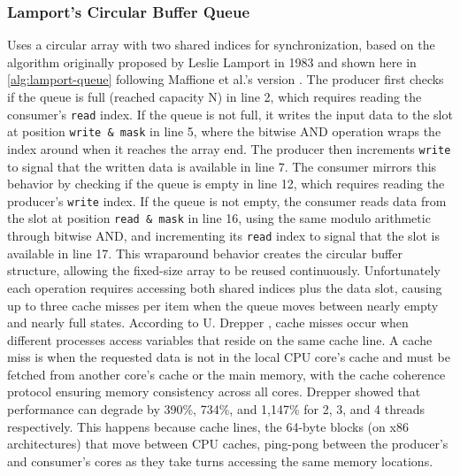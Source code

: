 \subsubsection{Lamport's Circular Buffer Queue}\label{subsubsec:lamport-circular-buffer-queue}
Uses a circular array with two shared indices for synchronization, based on the algorithm originally proposed by Leslie Lamport in 1983 \cite{Lamport1983SPSCCircularBuffer} and shown here in \cref{alg:lamport-queue} following Maffione et al.'s version \cite{MaffioneCacheAware}. The producer first checks if the queue is full (reached capacity N) in line 2, which requires reading the consumer's \texttt{read} index. If the queue is not full, it writes the input data to the slot at position \texttt{write \& mask} in line 5, where the bitwise AND operation wraps the index around when it reaches the array end. The producer then increments \texttt{write} to signal that the written data is available in line 7. The consumer mirrors this behavior by checking if the queue is empty in line 12, which requires reading the producer's \texttt{write} index. If the queue is not empty, the consumer reads data from the slot at position \texttt{read \& mask} in line 16, using the same modulo arithmetic through bitwise AND, and incrementing its \texttt{read} index to signal that the slot is available in line 17. This wraparound behavior creates the circular buffer structure, allowing the fixed-size array to be reused continuously. Unfortunately each operation requires accessing both shared indices plus the data slot, causing up to three cache misses per item when the queue moves between nearly empty and nearly full states. According to U. Drepper \cite{drepper2007every}, cache misses occur when different processes access variables that reside on the same cache line. A cache miss is when the requested data is not in the local CPU core's cache and must be fetched from another core's cache or the main memory, with the cache coherence protocol ensuring memory consistency across all cores. Drepper showed that performance can degrade by 390\%, 734\%, and 1,147\% for 2, 3, and 4 threads respectively. This happens because cache lines, the 64-byte blocks (on x86 architectures) that move between CPU caches, ping-pong between the producer's and consumer's cores as they take turns accessing the same memory locations.

